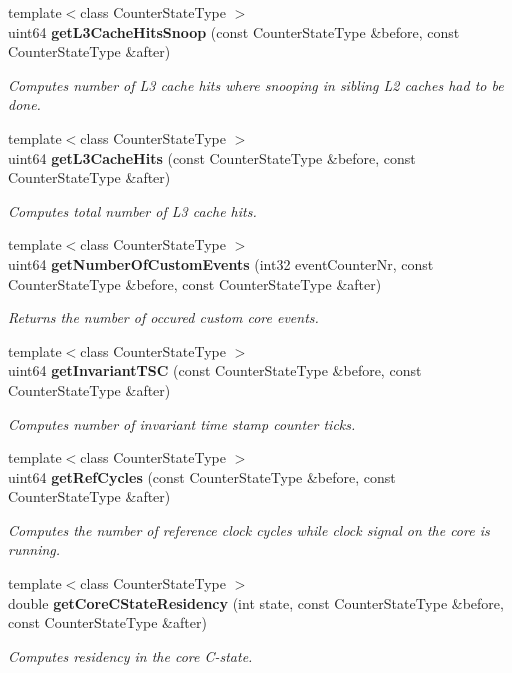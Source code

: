 \begin{DoxyCompactItemize}
{\footnotesize template$<$class Counter\+State\+Type $>$ }\\uint64 {\bf get\+L3\+Cache\+Hits\+Snoop} (const Counter\+State\+Type \&before, const Counter\+State\+Type \&after)
\begin{DoxyCompactList}\small\item\em Computes number of L3 cache hits where snooping in sibling L2 caches had to be done. \end{DoxyCompactList}\item 
{\footnotesize template$<$class Counter\+State\+Type $>$ }\\uint64 {\bf get\+L3\+Cache\+Hits} (const Counter\+State\+Type \&before, const Counter\+State\+Type \&after)
\begin{DoxyCompactList}\small\item\em Computes total number of L3 cache hits. \end{DoxyCompactList}\item 
{\footnotesize template$<$class Counter\+State\+Type $>$ }\\uint64 {\bf get\+Number\+Of\+Custom\+Events} (int32 event\+Counter\+Nr, const Counter\+State\+Type \&before, const Counter\+State\+Type \&after)
\begin{DoxyCompactList}\small\item\em Returns the number of occured custom core events. \end{DoxyCompactList}\item 
{\footnotesize template$<$class Counter\+State\+Type $>$ }\\uint64 {\bf get\+Invariant\+T\+SC} (const Counter\+State\+Type \&before, const Counter\+State\+Type \&after)
\begin{DoxyCompactList}\small\item\em Computes number of invariant time stamp counter ticks. \end{DoxyCompactList}\item 
{\footnotesize template$<$class Counter\+State\+Type $>$ }\\uint64 {\bf get\+Ref\+Cycles} (const Counter\+State\+Type \&before, const Counter\+State\+Type \&after)
\begin{DoxyCompactList}\small\item\em Computes the number of reference clock cycles while clock signal on the core is running. \end{DoxyCompactList}\item 
{\footnotesize template$<$class Counter\+State\+Type $>$ }\\double {\bf get\+Core\+C\+State\+Residency} (int state, const Counter\+State\+Type \&before, const Counter\+State\+Type \&after)
\begin{DoxyCompactList}\small\item\em Computes residency in the core C-\/state. \end{DoxyCompactList}\end{DoxyCompactItemize}


